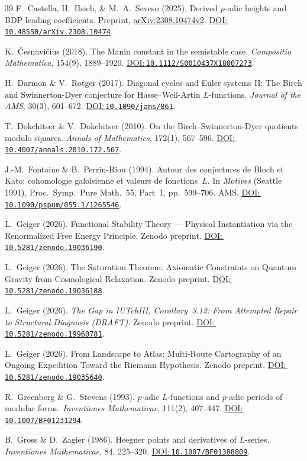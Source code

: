 \documentclass[aps,prd,twocolumn,superscriptaddress,nofootinbib,floatfix]{revtex4-2}
\newcommand{\doilink}[1]{\href{https://doi.org/#1}{DOI:\,\nolinkurl{#1}}}
\theoremstyle{definition}
\theoremstyle{remark}
\begin{document}
\begin{thebibliography}{39}
F.~Castella, H.~Hsieh, \& M.~A.~Seveso (2025).
Derived $p$-adic heights and BDP leading coefficients.
Preprint, \href{https://arxiv.org/abs/2308.10474v2}{arXiv:2308.10474v2}.
\doilink{10.48550/arXiv.2308.10474}.

K.~Česnavičius (2018).
The Manin constant in the semistable case.
\textit{Compositio Mathematica}, 154(9), 1889--1920.
\doilink{10.1112/S0010437X18007273}.

H.~Darmon \& V.~Rotger (2017).
Diagonal cycles and Euler systems II: The Birch and Swinnerton-Dyer conjecture for Hasse--Weil-Artin $L$-functions.
\textit{Journal of the AMS}, 30(3), 601--672.
\doilink{10.1090/jams/861}.

T.~Dokchitser \& V.~Dokchitser (2010).
On the Birch--Swinnerton-Dyer quotients modulo squares.
\textit{Annals of Mathematics}, 172(1), 567--596.
\doilink{10.4007/annals.2010.172.567}.

J.-M.~Fontaine \& B.~Perrin-Riou (1994).
Autour des conjectures de Bloch et Kato: cohomologie galoisienne et valeurs de fonctions~$L$.
In \textit{Motives} (Seattle 1991), Proc.\ Symp.\ Pure Math.\ 55, Part~1, pp.\ 599--706. AMS.
\doilink{10.1090/pspum/055.1/1265546}.

L.~Geiger (2026).
Functional Stability Theory --- Physical Instantiation via the Renormalized Free Energy Principle.
Zenodo preprint.
\doilink{10.5281/zenodo.19036190}.

L.~Geiger (2026).
The Saturation Theorem: Axiomatic Constraints on Quantum Gravity from Cosmological Relaxation.
Zenodo preprint.
\doilink{10.5281/zenodo.19036188}.

L.~Geiger (2026).
\textit{The Gap in IUTchIII, Corollary~3.12: From Attempted Repair to Structural Diagnosis (DRAFT)}.
Zenodo preprint.
\doilink{10.5281/zenodo.19960781}.

L.~Geiger (2026).
From Landscape to Atlas: Multi-Route Cartography of an Ongoing Expedition Toward the Riemann Hypothesis.
Zenodo preprint.
\doilink{10.5281/zenodo.19035640}.

R.~Greenberg \& G.~Stevens (1993).
$p$-adic $L$-functions and $p$-adic periods of modular forms.
\textit{Inventiones Mathematicae}, 111(2), 407--447.
\doilink{10.1007/BF01231294}.

B.~Gross \& D.~Zagier (1986).
Heegner points and derivatives of $L$-series.
\textit{Inventiones Mathematicae}, 84, 225--320.
\doilink{10.1007/BF01388809}.


\end{thebibliography}
\end{document}

